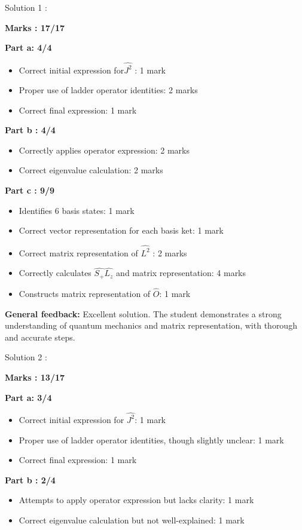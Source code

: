 \documentclass[a4paper,11pt]{article}
\begin{document}
Solution 1 :

\textbf{Marks : 17/17}

\textbf{Part a: 4/4}
\begin{itemize}
    \item Correct initial expression for$\hat{J^2}$ : 1 mark
    \item Proper use of ladder operator identities: 2 marks
    \item Correct final expression: 1 mark
\end{itemize}

\textbf{Part b : 4/4}
\begin{itemize}
    \item Correctly applies operator expression: 2 marks
    \item Correct eigenvalue calculation: 2 marks
\end{itemize}

\textbf{Part c : 9/9}
\begin{itemize}
    \item Identifies 6 basis states: 1 mark
    \item Correct vector representation for each basis ket: 1 mark
    \item Correct matrix representation of $\hat{L^2}$ : 2 marks
    \item Correctly calculates $\hat{S_+}\hat{L_z}$ and matrix representation: 4 marks
    \item Constructs matrix representation of $\hat{O}$: 1 mark
\end{itemize}

\textbf{General feedback:}
Excellent solution. The student demonstrates a strong understanding of quantum mechanics and matrix representation, with thorough and accurate steps.


Solution 2 :

\textbf{Marks : 13/17}

\textbf{Part a: 3/4}
\begin{itemize}
    \item Correct initial expression for $\hat{J^2}$: 1 mark
    \item Proper use of ladder operator identities, though slightly unclear: 1 mark
    \item Correct final expression: 1 mark   
\end{itemize}

\textbf{Part b : 2/4}
\begin{itemize}
    \item Attempts to apply operator expression but lacks clarity: 1 mark
    \item Correct eigenvalue calculation but not well-explained: 1 mark
\end{itemize}
\end{document}
